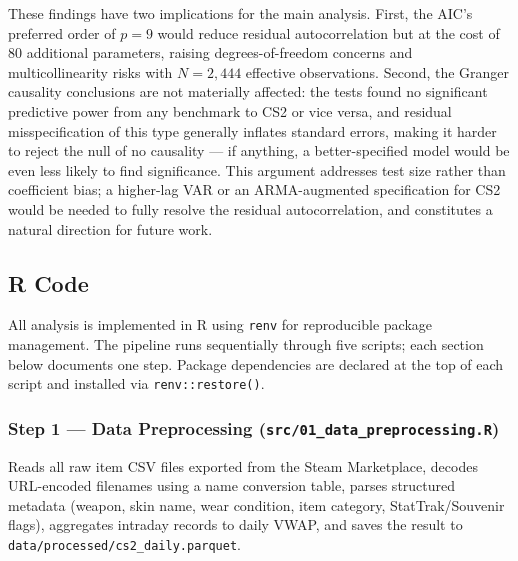 These findings have two implications for the main analysis. First, the AIC's
preferred order of $p = 9$ would reduce residual autocorrelation but at the cost
of 80 additional parameters, raising degrees-of-freedom concerns and
multicollinearity risks with $N = 2{,}444$ effective observations. Second, the
Granger causality conclusions are not materially affected: the tests found no
significant predictive power from any benchmark to CS2 or vice versa, and
residual misspecification of this type generally inflates standard errors,
making it harder to reject the null of no causality --- if anything, a
better-specified model would be even less likely to find significance. This
argument addresses test size rather than coefficient bias; a higher-lag VAR or
an ARMA-augmented specification for CS2 would be needed to fully resolve the
residual autocorrelation, and constitutes a natural direction for future
work.

\subsection{R Code}

All analysis is implemented in R using \texttt{renv} for reproducible package
management. The pipeline runs sequentially through five scripts; each section
below documents one step. Package dependencies are declared at the top of each
script and installed via \texttt{renv::restore()}.

\subsubsection*{Step 1 --- Data Preprocessing (\texttt{src/01\_data\_preprocessing.R})}

Reads all raw item CSV files exported from the Steam Marketplace, decodes
URL-encoded filenames using a name conversion table, parses structured metadata
(weapon, skin name, wear condition, item category, StatTrak/Souvenir flags),
aggregates intraday records to daily VWAP, and saves the result to
\texttt{data/processed/cs2\_daily.parquet}.

